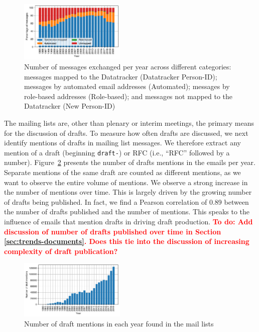 \documentclass[twocolumn,10pt]{article}
\newcommand{\todo}[1]{\textbf{\textcolor{red}{To do: #1}}}
\newcommand{\pb}[1]{\vspace{0.75ex}\noindent{\textbf{#1}}}
\begin{document}
\begin{figure}
\includegraphics[width=0.45\textwidth]{figures-prev/imc-2021/emails/frequency_emails_yearly_categories2.pdf}
\caption{Number of messages exchanged per year across different categories:
  messages mapped to the Datatracker (Datatracker Person-ID); messages by
  automated email addresses (Automated); messages by role-based addresses
  (Role-based); and messages not mapped to the Datatracker (New Person-ID)}
\label{fig:emailvol_by_year_catg}
\end{figure}

\pb{Discussion of drafts:}
The mailing lists are, other than plenary or interim meetings, the primary
means for the discussion of drafts.  To measure how often drafts are
discussed, we next identify mentions of drafts in mailing list messages.
We therefore extract any mention of a draft (beginning \texttt{draft-}) or
RFC (i.e., ``RFC'' followed by a number).  Figure~\ref{fig:draft_mentions}
presents the number of drafts mentions in the emails per year. Separate
mentions of the same draft are counted as different mentions, as we want to
observe the entire volume of mentions.  We observe a strong increase in the
number of mentions over time.  This is largely driven by the growing number
of drafts being published. In fact, we find a Pearson correlation of 0.89
between the number of drafts published and the number of mentions. This
speaks to the influence of emails that mention drafts in driving draft
production.
\todo{Add discussion of number of drafts published over time in Section
\ref{sec:trends-documents}. Does this tie into the discussion of increasing
complexity of draft publication?}

\begin{figure}
\includegraphics[width=0.45\textwidth]{figures-prev/imc-2021/emails/yearly-draft-mention-volume.pdf}
\caption{Number of draft mentions in each year found in the mail lists}
\label{fig:draft_mentions}
\end{figure}
\end{document}
